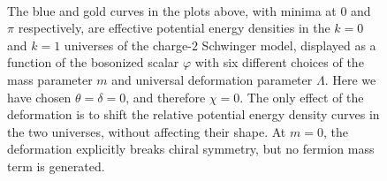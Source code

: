 \documentclass[11pt]{article}
\begin{document}
\begin{figure}[!ht]
\centering
{}
\\ \vspace{.5cm}
\caption{The blue and gold curves in the plots above, with minima at $0$ and $\pi$ respectively, are effective potential energy densities in the $k=0$ and $k=1$ universes of the charge-$2$ Schwinger model, displayed as a function of the bosonized scalar $\varphi$ with six different choices of the mass parameter $m$ and universal deformation parameter $\Lambda$. Here we have chosen $\theta=\delta=0$, and therefore $\chi=0$. The only effect of the deformation is to shift the relative potential energy density curves in the two universes, without affecting their shape.  At $m=0$, the deformation explicitly breaks chiral symmetry, but no fermion mass term is generated.} 
\label{fig:Schwinger_vacua} 
\end{figure}
\end{document}
